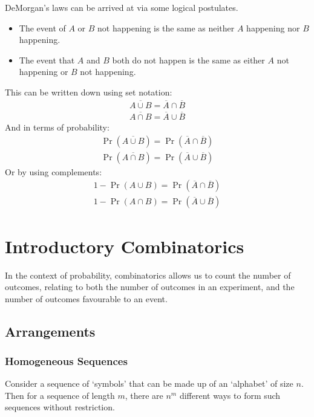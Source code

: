 \documentclass[11pt]{report} %
\begin{document}
DeMorgan's laws can be arrived at via some logical postulates.
\begin{itemize}
\item The event of $A$ or $B$ not happening is the same as neither $A$ happening nor $B$ happening.
\item The event that $A$ and $B$ both do not happen is the same as either $A$ not happening or $B$ not happening. 
\end{itemize}
This can be written down using set notation:
\begin{gather}
\overline{A \cup B} = \overline{A} \cap \overline{B} \\
\overline{A \cap B} = \overline{A} \cup \overline{B}
\end{gather}
And in terms of probability:
\begin{gather}
\operatorname{Pr}\left(\overline{A \cup B}\right) = \operatorname{Pr}\left(\overline{A} \cap \overline{B}\right) \\
\operatorname{Pr}\left(\overline{A \cap B}\right) = \operatorname{Pr}\left(\overline{A} \cup \overline{B}\right)
\end{gather}
Or by using complements:
\begin{gather}
1 - \operatorname{Pr}\left(A \cup B\right) = \operatorname{Pr}\left(\overline{A} \cap \overline{B}\right) \\
1 - \operatorname{Pr}\left(A \cap B\right) = \operatorname{Pr}\left(\overline{A} \cup \overline{B}\right)
\end{gather}

\section{Introductory Combinatorics}

In the context of probability, combinatorics allows us to count the number of outcomes, relating to both the number of outcomes in an experiment, and the number of outcomes favourable to an event.

\subsection{Arrangements}

\subsubsection{Homogeneous Sequences}
Consider a sequence of `symbols' that can be made up of an `alphabet' of size $n$. Then for a sequence of length $m$, there are $n^{m}$ different ways to form such sequences without restriction.
\end{document}
